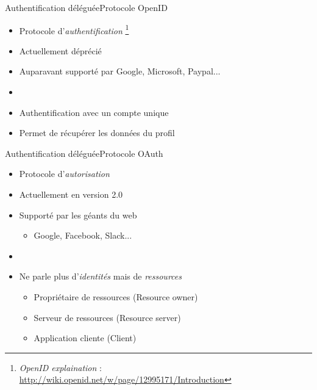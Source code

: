 \documentclass{beamer}
\begin{document}
\begin{frame}{Authentification déléguée}{Protocole OpenID}
  \begin{center}
    \begin{itemize}
      \item {
        Protocole d'\emph{authentification}
        \footnote[frame]{
          \emph{OpenID explaination} :
          \url{http://wiki.openid.net/w/page/12995171/Introduction}
        }
      }
      \item Actuellement déprécié
      \item Auparavant supporté par Google, Microsoft, Paypal...
      \item[~]
      \item Authentification avec un compte unique
      \item Permet de récupérer les données du profil
    \end{itemize}
  \end{center}
\end{frame}

\begin{frame}{Authentification déléguée}{Protocole OAuth}
  \begin{center}
    \begin{itemize}
      \item Protocole d'\emph{autorisation}
      \item Actuellement en version 2.0
      \item Supporté par les géants du web
      \begin{itemize}
        \item Google, Facebook, Slack...
      \end{itemize}
      \item[~]
      \item Ne parle plus d'\emph{identités} mais de \emph{ressources}
        \begin{itemize}
          \item Propriétaire de ressources (Resource owner)
          \item Serveur de ressources (Resource server)
          \item Application cliente (Client)
        \end{itemize}
    \end{itemize}
  \end{center}
\end{frame}
\end{document}
